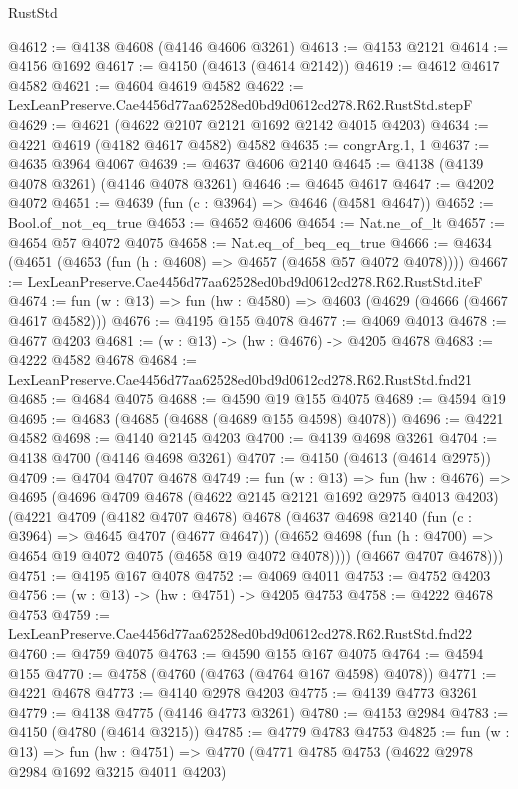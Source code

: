\begin{lexlean}{RustStd}
\begin{coremodule}
@4612 := @4138 @4608 (@4146 @4606 @3261)
@4613 := @4153 @2121
@4614 := @4156 @1692
@4617 := @4150 (@4613 (@4614 @2142))
@4619 := @4612 @4617 @4582
@4621 := @4604 @4619 @4582
@4622 := LexLeanPreserve.Cae4456d77aa62528ed0bd9d0612cd278.R62.RustStd.stepF
@4629 := @4621 (@4622 @2107 @2121 @1692 @2142 @4015 @4203)
@4634 := @4221 @4619 (@4182 @4617 @4582) @4582
@4635 := congrArg.{1, 1}
@4637 := @4635 @3964 @4067
@4639 := @4637 @4606 @2140
@4645 := @4138 (@4139 @4078 @3261) (@4146 @4078 @3261)
@4646 := @4645 @4617
@4647 := @4202 @4072
@4651 := @4639 (fun (c : @3964) => @4646 (@4581 @4647))
@4652 := Bool.of_not_eq_true
@4653 := @4652 @4606
@4654 := Nat.ne_of_lt
@4657 := @4654 @57 @4072 @4075
@4658 := Nat.eq_of_beq_eq_true
@4666 := @4634 (@4651 (@4653 (fun (h : @4608) => @4657 (@4658 @57 @4072 @4078))))
@4667 := LexLeanPreserve.Cae4456d77aa62528ed0bd9d0612cd278.R62.RustStd.iteF
@4674 := fun (w : @13) => fun (hw : @4580) => @4603 (@4629 (@4666 (@4667 @4617 @4582)))
@4676 := @4195 @155 @4078
@4677 := @4069 @4013
@4678 := @4677 @4203
@4681 := (w : @13) -> (hw : @4676) -> @4205 @4678
@4683 := @4222 @4582 @4678
@4684 := LexLeanPreserve.Cae4456d77aa62528ed0bd9d0612cd278.R62.RustStd.fnd21
@4685 := @4684 @4075
@4688 := @4590 @19 @155 @4075
@4689 := @4594 @19
@4695 := @4683 (@4685 (@4688 (@4689 @155 @4598) @4078))
@4696 := @4221 @4582
@4698 := @4140 @2145 @4203
@4700 := @4139 @4698 @3261
@4704 := @4138 @4700 (@4146 @4698 @3261)
@4707 := @4150 (@4613 (@4614 @2975))
@4709 := @4704 @4707 @4678
@4749 := fun (w : @13) =>
  fun (hw : @4676) =>
  @4695
    (@4696
      @4709
      @4678
      (@4622 @2145 @2121 @1692 @2975 @4013 @4203)
      (@4221
        @4709
        (@4182 @4707 @4678)
        @4678
        (@4637
          @4698
          @2140
          (fun (c : @3964) => @4645 @4707 (@4677 @4647))
          (@4652 @4698 (fun (h : @4700) => @4654 @19 @4072 @4075 (@4658 @19 @4072 @4078))))
        (@4667 @4707 @4678)))
@4751 := @4195 @167 @4078
@4752 := @4069 @4011
@4753 := @4752 @4203
@4756 := (w : @13) -> (hw : @4751) -> @4205 @4753
@4758 := @4222 @4678 @4753
@4759 := LexLeanPreserve.Cae4456d77aa62528ed0bd9d0612cd278.R62.RustStd.fnd22
@4760 := @4759 @4075
@4763 := @4590 @155 @167 @4075
@4764 := @4594 @155
@4770 := @4758 (@4760 (@4763 (@4764 @167 @4598) @4078))
@4771 := @4221 @4678
@4773 := @4140 @2978 @4203
@4775 := @4139 @4773 @3261
@4779 := @4138 @4775 (@4146 @4773 @3261)
@4780 := @4153 @2984
@4783 := @4150 (@4780 (@4614 @3215))
@4785 := @4779 @4783 @4753
@4825 := fun (w : @13) =>
  fun (hw : @4751) =>
  @4770
    (@4771
      @4785
      @4753
      (@4622 @2978 @2984 @1692 @3215 @4011 @4203)

\end{coremodule}
\end{lexlean}
